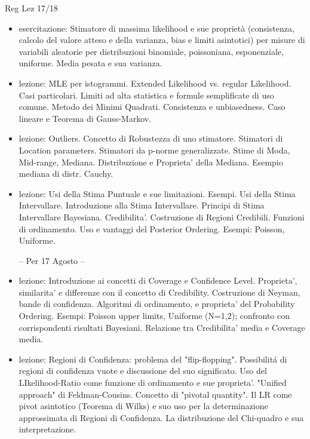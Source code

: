 \begin{frame}[allowframebreaks]{Reg Lez 17/18}
\begin{itemize}
\item esercitazione: Stimatore di massima likelihood e sue proprietà (consistenza, calcolo del valore atteso e della varianza, bias e limiti asintotici) per misure di variabili aleatorie per distribuzioni binomiale, poissoniana, esponenziale, uniforme. Media pesata e sua varianza.

\item lezione: MLE per istogrammi. Extended Likelihood vs. regular Likelihood. Casi particolari. Limiti ad alta statistica e formule semplificate di uso comune. Metodo dei Minimi Quadrati. Consistenza e unbiasedness. Caso lineare e Teorema di Gauss-Markov.

\item lezione: Outliers. Concetto di Robustezza di uno stimatore. Stimatori di Location parameters. Stimatori da p-norme generalizzate. Stime di Moda, Mid-range, Mediana. Distribuzione e Proprieta' della Mediana. Esempio mediana di distr. Cauchy.

\hypertarget{stimatori}{}

\item lezione: Usi della Stima Puntuale e sue limitazioni. Esempi. Usi della Stima Intervallare. Introduzione alla Stima Intervallare. Principi di Stima Intervallare Bayesiana. Credibilita'. Costruzione di Regioni Credibili. Funzioni di ordinamento. Uso e vantaggi del Posterior Ordering. Esempi: Poisson, Uniforme.

-- Per 17 Agosto --

\hypertarget{confidence}{}

\item lezione: Introduzione ai concetti di Coverage e Confidence Level. Proprieta', similarita' e differenze con il concetto di Credibility. Costruzione di Neyman, bande di confidenza. Algoritmi di ordinamento, e proprieta' del Probability Ordering. Esempi: Poisson upper limits, Uniforme (N=1,2); confronto con corrispondenti risultati Bayesiani. Relazione tra Credibilita' media e Coverage media.

\item  lezione: Regioni di Confidenza: problema del "flip-flopping". Possibilit\'a di regioni di confidenza vuote e discussione del suo significato. Uso del LIkelihood-Ratio come funzione di ordinamento e sue proprieta'. "Unified approach" di Feldman-Cousins. Concetto di "pivotal quantity". Il LR come pivot asintotico (Teorema di Wilks) e suo uso per la determinazione approssimata di Regioni di Confidenza. La distribuzione del Chi-quadro e sua interpretazione. 


\end{itemize}
\end{frame}

